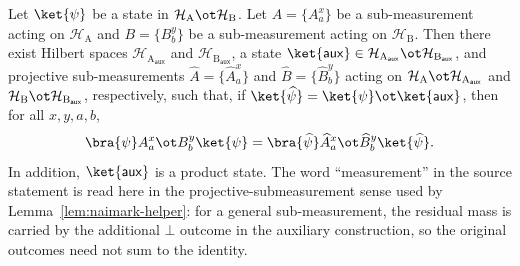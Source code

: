 \begin{theorem}\label{thm:naimark}
	\leanok
	Let $\ket{\psi}$ be a state in $\mathcal H_{\mathrm A} \ot \mathcal H_{\mathrm B}$.
	Let $A = \{A^x_a\}$ be a sub-measurement acting on $\mathcal H_{\mathrm A}$
	and $B=\{B^y_b\}$ be a sub-measurement acting on $\mathcal H_{\mathrm B}$.
	Then there exist Hilbert spaces $\mathcal H_{\mathrm A_{\mathsf{aux}}}$ and $\mathcal H_{\mathrm B_{\mathsf{aux}}}$,
	a state $\ket{\mathsf{aux}} \in \mathcal H_{\mathrm A_{\mathsf{aux}}} \ot \mathcal H_{\mathrm B_{\mathsf{aux}}}$,
	and projective sub-measurements $\widehat{A} = \{\widehat{A}^x_a\}$ and $\widehat{B}=\{\widehat{B}^y_b\}$
	acting on $\mathcal H_{\mathrm A} \ot \mathcal H_{\mathrm A_{\mathsf{aux}}}$
	and $\mathcal H_{\mathrm B} \ot \mathcal H_{\mathrm B_{\mathsf{aux}}}$, respectively,
	such that, if $\ket{\widehat{\psi}} = \ket{\psi} \ot \ket{\mathsf{aux}}$, then for all $x,y,a,b$,
	\[
		\bra{\psi} A^x_a \ot B^y_b \ket{\psi}
		=
		\bra{\widehat{\psi}} \widehat{A}^x_a \ot \widehat{B}^y_b \ket{\widehat{\psi}}.
	\]
	In addition, $\ket{\mathsf{aux}}$ is a product state.
	The word ``measurement'' in the source statement is read here in the
	projective-submeasurement sense used by Lemma~\ref{lem:naimark-helper}: for a
	general sub-measurement, the residual mass is carried by the additional
	\(\bot\) outcome in the auxiliary construction, so the original outcomes need
	not sum to the identity.
\end{theorem}
